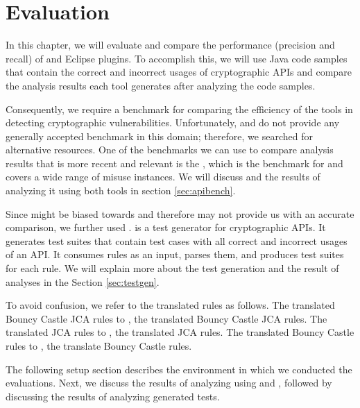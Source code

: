 \chapter{Evaluation}
\label{ch:eval}
In this chapter, we will evaluate and compare the performance (precision and recall) of \codyze{} and \cognicryptsast{} Eclipse plugins. To accomplish this, we will use Java code samples that contain the correct and incorrect usages of cryptographic APIs and compare the analysis results each tool generates after analyzing the code samples.

Consequently, we require a benchmark for comparing the efficiency of the tools in detecting cryptographic vulnerabilities. Unfortunately, \codyze{} and \cognicryptsast{} do not provide any generally accepted benchmark in this domain; therefore, we searched for alternative resources. One of the benchmarks we can use to compare analysis results that is more recent and relevant is the \cryptoapibench{} \cite{cryptoapibench}, which is the benchmark for \cryptoguard{} \cite{sr19} and covers a wide range of misuse instances. We will discuss \cryptoapibench{} and the results of analyzing it using both tools in section \ref{sec:apibench}. 

Since \cryptoapibench{} might be biased towards \cryptoguard{} and therefore may not provide us with an accurate comparison, we further used \cognicrypttestgen{}\cite{rakshit}. \cognicrypttestgen{} is a test generator for cryptographic APIs. It generates test suites that contain test cases with all correct and incorrect usages of an API. It consumes \crysl{} rules as an input, parses them, and produces test suites for each rule. We will explain more about the test generation and the result of analyses in the Section \ref{sec:testgen}.

To avoid confusion, we refer to the translated rules as follows.
The translated Bouncy Castle JCA \crysl{} rules to \MARK, the translated Bouncy Castle JCA \MARK{} rules. The translated JCA \crysl{} rules to \MARK, the translated JCA \MARK{} rules. The translated Bouncy Castle \MARK{} rules to \crysl, the translate Bouncy Castle \crysl{} rules.

The following setup section describes the environment in which we conducted the evaluations. Next, we discuss the results of analyzing \cryptoapibench{} using \cognicryptsast{} and \codyze, followed by discussing the results of analyzing \cognicrypttestgen{} generated tests.

